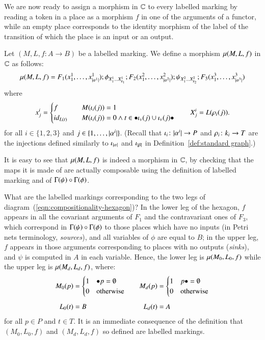 We are now ready to assign a morphism in $\mathbb C$ to every labelled marking by reading a token in a place as a morphism $f$ in one of the arguments of a functor, while an empty place corresponds to the identity morphism of the label of the transition of which the place is an input or an output.
\begin{definition}\label{def:morphism for labelled marking}
	Let $(M,L,f\colon A \to B)$ be a labelled marking. We define a morphism $\mu(M,L,f)$ in $\mathbb C$ as follows:
	\[
	\mor M L f = F_1(x^1_1,\dots,x^1_{\length{\alpha^1}});\phi_{X^1_1\dots X^1_{k_1}} ; 
	F_2(x^2_1,\dots,x^2_{\length{\alpha^2}}); \psi_{X^2_1\dots X^2_{k_2}} ; F_{3}(x^{3}_1,\dots,x^{3}_{\length{\alpha^{3}}})
	\]
	where
	\[
	x^i_j = \begin{cases}
	f \quad &M(\injP i (j)) = 1 \\
	\id{L(t)} \quad & M(\injP i (j)) = 0 \land t \in \inp {\injP v (j)} \cup \out {\injP v (j)} 
	\end{cases}
	\qquad
	X^i_j = L(\injT i (j)).
	\]
	for all $i \in \{1,2,3\}$ and $j\in\{1,\dots,\lvert \alpha^i \rvert\}$. (Recall that $\iota_{i} \colon \lvert \alpha^i \rvert \to P$ and $\rho_{i} \colon k_i \to T$ are the injections defined similarly to $\iota_{\lvert \alpha \rvert}$ and $\iota_{\lvert \beta \rvert}$ in Definition~\ref{def:standard graph}.)
\end{definition}

It is easy to see that $\mu(M,L,f)$ is indeed a morphism in $\mathbb C$, by checking that the maps it is made of are actually composable using the definition of labelled marking and of $\graph\psi \circ \graph\phi$.

What are the labelled markings corresponding to the two legs of diagram~(\ref{eqn:compositionality-hexagon})? In the lower leg of the hexagon, $f$ appears in all the covariant arguments of $F_1$ and the contravariant ones of $F_{3}$, which correspond in $\graph\psi \circ \graph\phi$ to those places which have no inputs (in Petri nets terminology, \emph{sources}), and all variables of $\phi$ are equal to $B$; in the upper leg, $f$ appears in those arguments corresponding to places with no outputs (\emph{sinks}), and $\psi$ is computed in $A$ in each variable. Hence, the lower leg is $\mu(M_0,L_0,f)$ while the upper leg is $\mu(M_d,L_d,f)$, where:
\begin{equation}\label{eqn:markings-definitions}
\begin{aligned}
M_0(p)&=\begin{cases}
1 & \inp p = \emptyset \\
0 & \text{otherwise}
\end{cases} \quad
&
M_d(p)&=\begin{cases}
1 & \out p = \emptyset \\
0 & \text{otherwise}
\end{cases}
\\[.5em]
L_0(t) &= B 
&
L_d(t) &= A
\end{aligned}
\end{equation}
for all $p\in P$ and $t \in T$. It is an immediate consequence of the definition that $(M_0,L_0,f)$ and $(M_d,L_d,f)$ so defined are labelled markings.

